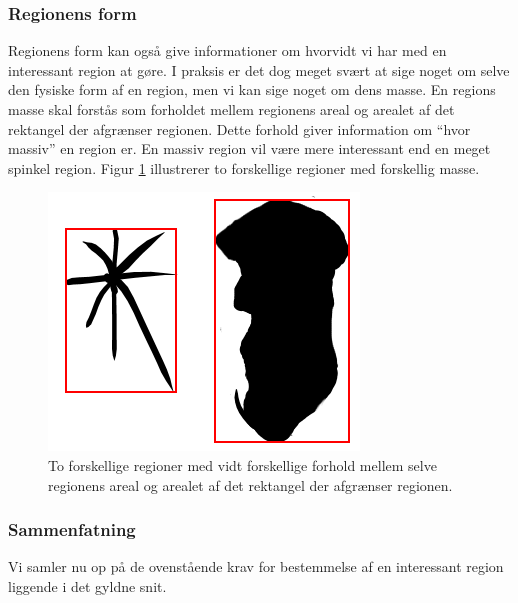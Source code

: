 {\subsubsection{Regionens form}
Regionens form kan også give informationer om hvorvidt vi har med en
interessant region at gøre. I praksis er det dog meget svært at sige
noget om selve den fysiske form af en region, men vi kan sige noget om
dens masse. En regions masse skal forstås som forholdet mellem regionens areal og
arealet af det rektangel der afgrænser regionen. Dette forhold giver
information om ``hvor massiv'' en region er. En massiv region vil være
mere interessant end en meget spinkel region. Figur \ref{region_mass}
illustrerer to forskellige regioner med forskellig masse.
\begin{figure}[h]
	\begin{center}
		\includegraphics[scale=\imgscale,angle=0]{afsnit/vores_implementation/billeder/naiv_algoritme/bbox_area_ratio}
	\end{center}
	\caption[Regioners masse]{To forskellige regioner med vidt forskellige forhold
	mellem selve regionens areal og arealet af det rektangel der
	afgrænser regionen.}
	\label{region_mass}
\end{figure}

\subsubsection{Sammenfatning}
Vi samler nu op på de ovenstående krav for bestemmelse af en interessant
region liggende i det gyldne snit.

}
